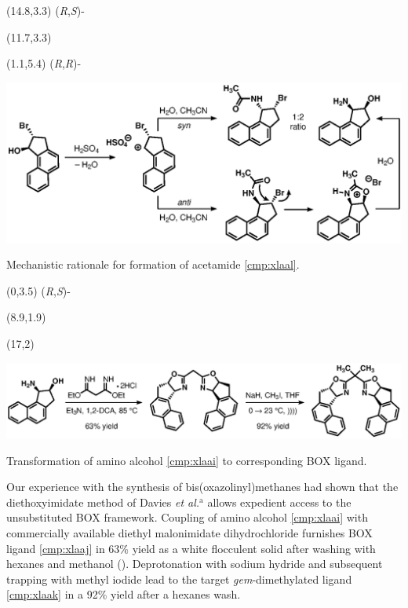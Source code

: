 \begin{Scheme}[t]
  \centering
   \begin{textblock}{3}(14.8,3.3) \textsf{\scriptsize{(\textit{R},\textit{S})-}}
   \end{textblock}
   \begin{textblock}{1}(11.7,3.3)  \end{textblock}
\begin{textblock}{3}(1.1,5.4) \textsf{\scriptsize{(\textit{R},\textit{R})-}}
  \end{textblock}
  \includegraphics[scale=0.8]{chp_asymmetric/images/rittermechanism}
  \caption{Mechanistic rationale for formation of acetamide \ref{cmp:xlaal}.}
  \label{sch:asrittermechanism}
\end{Scheme}
\begin{Scheme}[b]
  \centering
  \begin{textblock}{3}(0,3.5) \textsf{\scriptsize{(\textit{R},\textit{S})-}}
  \end{textblock}
  \begin{textblock}{1}(8.9,1.9)  \end{textblock}
  \begin{textblock}{1}(17,2)  \end{textblock}
  \includegraphics[scale=0.8]{chp_asymmetric/images/tlligandtwo}
  \caption{Transformation of amino alcohol \ref{cmp:xlaai} to corresponding BOX ligand.}
  \label{sch:astlligandtwo}
\end{Scheme}

Our experience with the synthesis of bis(oxazolinyl)methanes had shown that the diethoxyimidate
method of Davies \textit{et al.}$^\mathrm{a}$ allows expedient
access to the unsubstituted BOX framework.
Coupling of amino alcohol \ref{cmp:xlaai} with commercially available diethyl malonimidate
dihydrochloride furnishes BOX ligand \ref{cmp:xlaaj} in 63\% yield as a white flocculent solid
after washing with hexanes and
methanol (). Deprotonation with sodium hydride and subsequent trapping with
methyl iodide lead to the target \textit{gem}-dimethylated ligand \ref{cmp:xlaak} in a 92\% yield
after a hexanes wash.

